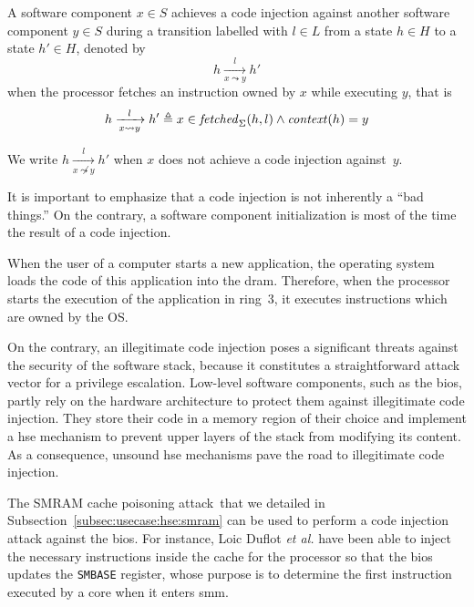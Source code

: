 \begin{definition}
  \label{def:speccert:tempering}
  A software component $x \in S$ achieves a code injection against another
  software component $y \in S$ during a transition labelled with $l \in L$ from
  a state $h \in H$ to a state $h' \in H$, denoted by
  \[
    h \xrightarrow[x \leadsto y]{l} h'
  \]
  when the processor fetches an instruction owned by $x$ while executing $y$,
  that is
  \[
    h \xrightarrow[x \leadsto y]{l} h' \triangleq x \in
    \mathit{fetched}_{\Sigma}(h, l) \wedge \mathit{context}(h) = y
  \]

  We write $h \xrightarrow[x \not\leadsto y]{l} h'$ when $x$ does not achieve a
  code injection against~$y$.
\end{definition}

It is important to emphasize that a code injection is not inherently a ``bad
things.''
%
On the contrary, a software component initialization is most of the time the
result of a code injection.

\begin{example}
  When the user of a computer starts a new application, the operating system
  loads the code of this application into the \ac{dram}.
  Therefore, when the processor starts the execution of the application in
  ring~3, it executes instructions which are owned by the OS.
\end{example}

On the contrary, an illegitimate code injection poses a significant threats
against the security of the software stack, because it constitutes a
straightforward attack vector for a privilege escalation.
%
Low-level software components, such as the \ac{bios}, partly rely on the
hardware architecture to protect them against illegitimate code injection.
%
They store their code in a memory region of their choice and implement a
\ac{hse} mechanism to prevent upper layers of the stack from modifying its
content.
%
As a consequence, unsound \ac{hse} mechanisms pave the road to illegitimate code
injection.

\begin{example}
  The SMRAM cache poisoning attack\,\cite{duflot2009smram,wojtczuk2009smram}
  that we detailed in Subsection~\ref{subsec:usecase:hse:smram} can be used to
  perform a code injection attack against the \ac{bios}.
  For instance, Loic Duflot \emph{et al.} have been able to inject the necessary
  instructions inside the cache for the processor so that the \ac{bios} updates
  the \texttt{SMBASE} register, whose purpose is to determine the first
  instruction executed by a core when it enters \ac{smm}.
\end{example}


